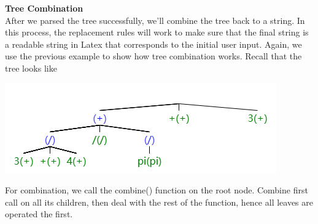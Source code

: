 \documentclass[11pt]{article}
\theoremstyle{definition}
\begin{document}
\begin{enumerate}
\textbf{Tree Combination} \\
After we parsed the tree successfully, we’ll combine the tree back to a string. In this process, the replacement rules will work to make sure that the final string is a readable string in Latex that corresponds to the initial user input. Again, we use the previous example to show how tree combination works. Recall that the tree looks like 
\begin{center}
\includegraphics[scale=0.7]{image3.png}
\end{center}
For combination, we call the combine() function on the root node. Combine first call on all its children, then deal with the rest of the function, hence all leaves are operated the first.


\end{enumerate}
\end{document}
